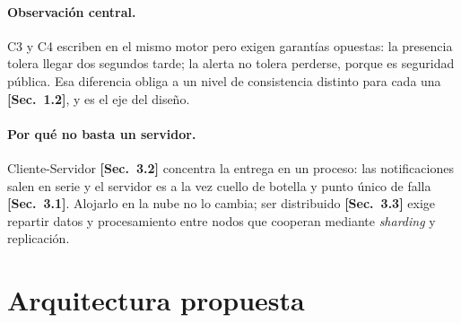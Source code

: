 \documentclass[11pt,a4paper]{article}
\newcommand{\sect}[1]{\textcolor{acento}{\textbf{[Sec.~#1]}}}
\begin{document}
\paragraph{Observación central.} C3 y C4 escriben en el mismo motor pero exigen
garantías opuestas: la presencia tolera llegar dos segundos tarde; la alerta no
tolera perderse, porque es seguridad pública. Esa diferencia obliga a un nivel de
consistencia distinto para cada una \sect{1.2}, y es el eje del diseño.

\paragraph{Por qué no basta un servidor.} Cliente-Servidor \sect{3.2} concentra la
entrega en un proceso: las notificaciones salen en serie y el servidor es a la vez
cuello de botella y punto único de falla \sect{3.1}. Alojarlo en la nube no lo
cambia; ser distribuido \sect{3.3} exige repartir datos y procesamiento entre
nodos que cooperan mediante \emph{sharding} y replicación.

\section{Arquitectura propuesta}
\end{document}
